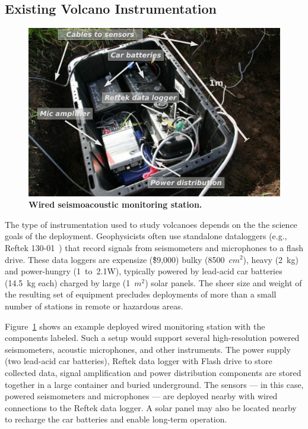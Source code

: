 \subsection{Existing Volcano Instrumentation}

\begin{figure}[t] 
\begin{center} 
\includegraphics[width=0.9\hsize]{./2-related/figs/Standalone.pdf}
\end{center} 
\caption{\textbf{Wired seismoacoustic monitoring station.}}
\label{related-fig-standalone}
\end{figure}

The type of instrumentation used to study volcanoes depends on the the
science goals of the deployment. Geophysicists often use standalone
dataloggers (e.g., Reftek 130-01~\cite{reftek}) that record signals from
seismometers and microphones to a flash drive. These data loggers are
expensize (\~\$9,000) bulky (8500~$cm^2$), heavy (2~kg) and power-hungry
(1~to~2.1W), typically powered by lead-acid car batteries (14.5~kg each)
charged by large (1~$m^2$) solar panels. The sheer size and weight of the
resulting set of equipment precludes deployments of more than a small number
of stations in remote or hazardous areas.

Figure~\ref{related-fig-standalone} shows an example deployed wired
monitoring station with the components labeled. Such a setup would support
several high-resolution powered seismometers, acoustic microphones, and other
instruments. The power supply (two lead-acid car batteries), Reftek data
logger with Flash drive to store collected data, signal amplification and
power distribution components are stored together in a large container and
buried underground. The sensors --- in this case, powered seismometers and
microphones --- are deployed nearby with wired connections to the Reftek data
logger. A solar panel may also be located nearby to recharge the car
batteries and enable long-term operation.

